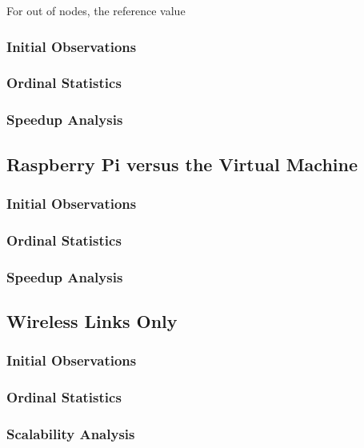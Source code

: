 For {} out of {} nodes, the reference value 

\subsubsection{Initial Observations}



\subsubsection{Ordinal Statistics}

\subsubsection{Speedup Analysis}



\subsection{Raspberry Pi versus the Virtual Machine}

\subsubsection{Initial Observations}

\subsubsection{Ordinal Statistics}

\subsubsection{Speedup Analysis}

\subsection{Wireless Links Only}

\subsubsection{Initial Observations}

\subsubsection{Ordinal Statistics}

\subsubsection{Scalability Analysis}

